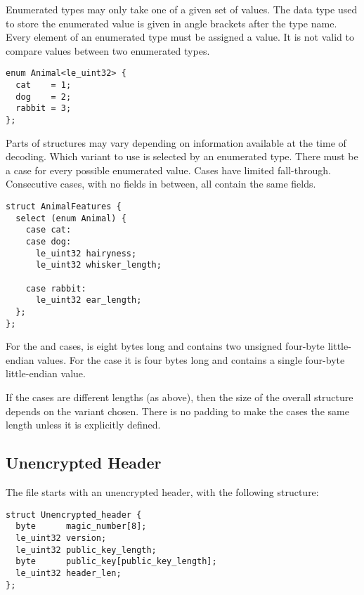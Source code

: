 Enumerated types may only take one of a given set of values.
%
The data type used to store the enumerated value is given in angle
brackets after the type name.
%
Every element of an enumerated type must be assigned a value.
%
It is not valid to compare values between two enumerated types.

\begin{verbatim}
enum Animal<le_uint32> {
  cat    = 1;
  dog    = 2;
  rabbit = 3;
};
\end{verbatim}

Parts of structures may vary depending on information available at the time of decoding.
%
Which variant to use is selected by an enumerated type.
%
There must be a case for every possible enumerated value.
%
Cases have limited fall-through.
%
Consecutive cases, with no fields in between, all contain the same fields.

\begin{verbatim}
struct AnimalFeatures {
  select (enum Animal) {
    case cat:
    case dog:
      le_uint32 hairyness;
      le_uint32 whisker_length;

    case rabbit:
      le_uint32 ear_length;
  };
};
\end{verbatim}

For the  and  cases,  is
eight bytes long and contains two unsigned four-byte little-endian
values.
%
For the  case it is four bytes long and contains a single
four-byte little-endian value.

If the cases are different lengths (as above), then the size of the
overall structure depends on the variant chosen.
%
There is no padding to make the cases the same length unless it is
explicitly defined.

\subsection{Unencrypted Header}\label{unencrypted:header}

The file starts with an unencrypted header, with the following structure:

\begin{verbatim}
struct Unencrypted_header {
  byte      magic_number[8];
  le_uint32 version;
  le_uint32 public_key_length;
  byte      public_key[public_key_length];
  le_uint32 header_len;
};
\end{verbatim}


